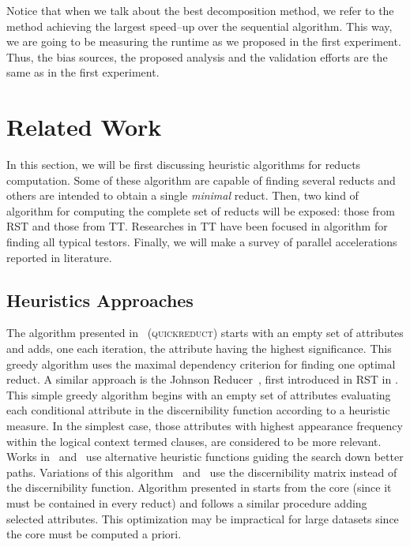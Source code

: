 \documentclass[11pt]{article}   %
\begin{document}
    Notice that when we talk about the best decomposition method, we refer to the method achieving the largest
    speed--up over the sequential algorithm. This way, we are going to be measuring the runtime as we proposed 
    in the first experiment. Thus, the bias sources, the proposed analysis and the validation efforts are the 
    same as in the first experiment.

\section{Related Work}\label{relatedWork}
  In this section, we will be first discussing heuristic algorithms for reducts computation. Some of these 
  algorithm are capable of finding several reducts and others are intended to obtain a single \textit{minimal} 
  reduct. Then, two kind of algorithm for computing the complete set of reducts will be exposed: those 
  from RST and those from TT. Researches in TT have been focused in algorithm for finding all typical testors.
  Finally, we will make a survey of parallel accelerations reported in literature.  
  
\subsection{Heuristics Approaches}
  The algorithm presented in~\cite{Chouchoulas01} (\textsc{quickreduct}) starts with an empty set of 
  attributes and adds, one each iteration, the attribute having the highest significance. This greedy algorithm 
  uses the maximal dependency criterion for finding one optimal reduct.  
  A similar approach is the Johnson Reducer~\cite{Johnson74}, first introduced in RST in \cite{Ohrn00}.
  This simple greedy algorithm begins with an empty set of attributes evaluating each conditional attribute in the
  discernibility function according to a heuristic measure. In the simplest case, those attributes with highest 
  appearance frequency within the logical context termed clauses, are considered to be more relevant. Works 
  in~\cite{Nguyen97} and~\cite{Wang01} use alternative heuristic functions guiding the search down better paths. 
  Variations of this algorithm~\cite{Wang01} and~\cite{Yang08} use the discernibility matrix instead of the
  discernibility function.
  Algorithm presented in \cite{Zhong01} starts from the core (since it must be contained in every reduct) and
  follows a similar procedure adding selected attributes. This optimization may be impractical for large datasets
  \cite{Jensen14} since the core must be computed a priori.
  
\end{document}

